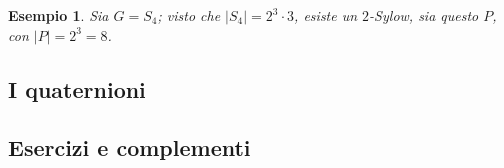 \documentclass[11pt]{scrartcl}
\theoremstyle{style1}
\newtheorem{esempio}{Esempio}[section]
\numberwithin{equation}{subsection}
\begin{document}
\begin{esempio}
Sia $G = S_4$; visto che $\lvert S_4 \rvert = 2^3 \cdot 3$, esiste un $2$-Sylow, sia questo $P$, con $\lvert P \rvert  = 2^3 = 8$.
\end{esempio}

\subsection{I quaternioni}
























\newpage
\subsection{Esercizi e complementi}
\end{document}
